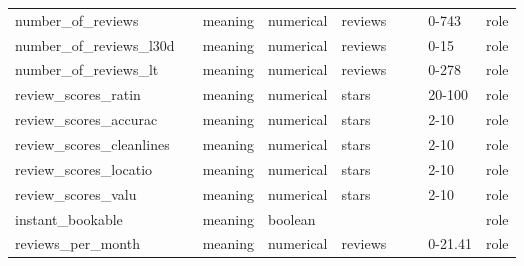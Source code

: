 \begin{center}
\begin{longtable}{@{}llllllll@{}}
number\_of\_reviews         &                             & meaning                           & numerical   & reviews        &                             &                     & 0-743   & role \\
number\_of\_reviews\_l30d   &                             & meaning                           & numerical   & reviews        &                             &                     & 0-15    & role \\
number\_of\_reviews\_lt     &                             & meaning                           & numerical   & reviews        &                             &                     & 0-278   & role \\
review\_scores\_ratin       &                             & meaning                           & numerical   & stars          &                             &                     & 20-100  & role \\
review\_scores\_accurac     &                             & meaning                           & numerical   & stars          &                             &                     & 2-10    & role \\
review\_scores\_cleanlines  &                             & meaning                           & numerical   & stars          &                             &                     & 2-10    & role \\
review\_scores\_locatio     &                             & meaning                           & numerical   & stars          &                             &                     & 2-10    & role \\
review\_scores\_valu        &                             & meaning                           & numerical   & stars          &                             &                     & 2-10    & role \\
instant\_bookable           &                             & meaning                           & boolean     &                &                             &                     &         & role \\
reviews\_per\_month         &                             & meaning                           & numerical   & reviews        &                             &                     & 0-21.41 & role \\ \bottomrule
\end{longtable}

\end{center}